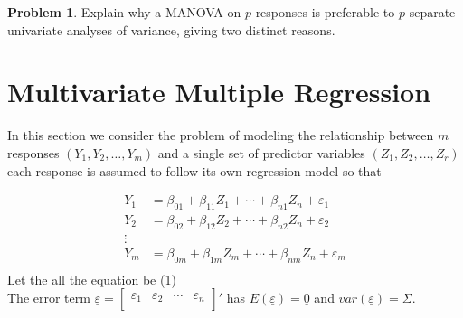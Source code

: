 \documentclass[11pt,a4paper]{article}
\theoremstyle{definition}
\newtheorem{problemx}{Problem}[section]
\newenvironment{problem}{\begin{problemx}}{\end{problemx}}
\begin{document}
\begin{problem}
Explain why a MANOVA on $p$ responses is preferable to $p$ separate univariate
analyses of variance, giving two distinct reasons.
\end{problem}

\section{Multivariate Multiple Regression}
In this section we consider the problem of modeling the relationship between $m$ responses $(Y_1,Y_2,\ldots,Y_m)$ and a single set of predictor variables $(Z_1,Z_2,\ldots,Z_r)$ each response is assumed to follow its own regression model so that 

\begin{align*}
Y_1 & = \beta_{01} + \beta_{11}Z_1 + \cdots+ \beta_{n1}Z_n + \varepsilon_1\\
Y_2 & = \beta_{02} + \beta_{12}Z_2 + \cdots+ \beta_{n2}Z_n + \varepsilon_2\\
\vdots &\\
Y_m & = \beta_{0m} + \beta_{1m}Z_{m} + \cdots+ \beta_{nm}Z_{n} + \varepsilon_{m}\\
\end{align*}
Let the all the equation be (1)\\

The error term $\underline{\varepsilon}=
\begin{bmatrix}
\varepsilon_1 & \varepsilon_2 & \cdots& \varepsilon_n\\
\end{bmatrix}'
$ has $E(\underline{\varepsilon})=\underline{0}$ and $var(\underline{\varepsilon})=\Sigma$.\\
\end{document}
